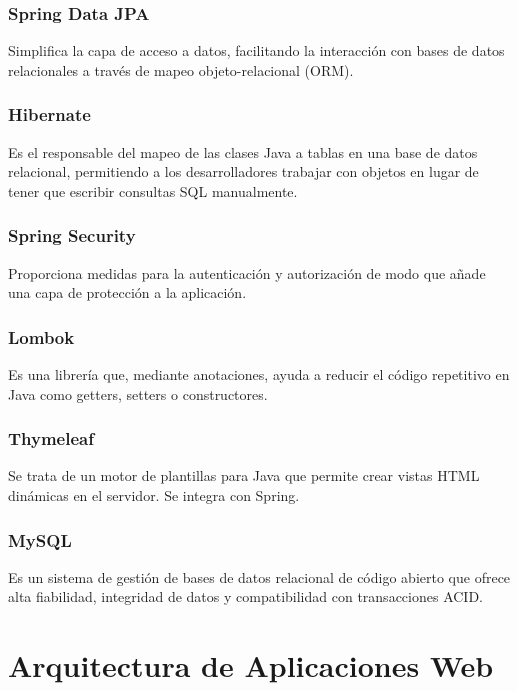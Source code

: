 \subsubsection{Spring Data JPA~\cite{spring-data-jpa}}
Simplifica la capa de acceso a datos, facilitando la interacción con bases de datos relacionales a través de mapeo objeto-relacional (ORM).

\subsubsection{Hibernate~\cite{hibernate}}
Es el responsable del mapeo de las clases Java a tablas en una base de datos relacional, permitiendo a los desarrolladores trabajar con objetos en lugar de tener que escribir consultas SQL manualmente.

\subsubsection{Spring Security~\cite{spring-security}}
Proporciona medidas para la autenticación y autorización de modo que añade una capa de protección a la aplicación.

\subsubsection{Lombok~\cite{lombok}}
Es una librería que, mediante anotaciones, ayuda a reducir el código repetitivo en Java como getters, setters o constructores.

\subsubsection{Thymeleaf~\cite{thymeleaf}}
Se trata de un motor de plantillas para Java que permite crear vistas HTML dinámicas en el servidor. Se integra con Spring.

\subsubsection{MySQL~\cite{mysql}}
Es un sistema de gestión de bases de datos relacional de código abierto que ofrece alta fiabilidad, integridad de datos y compatibilidad con transacciones ACID.

\section{Arquitectura de Aplicaciones Web}

